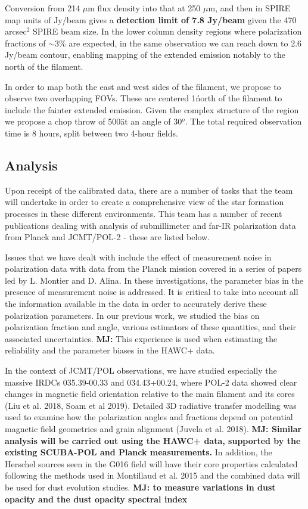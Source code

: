 \documentclass[11pt]{amsart}
\begin{document}
{Conversion from 214 $\mu$m flux density into that at 250 $\mu$m, and then in SPIRE map units of Jy/beam gives a {\bf detection limit of 7.8 Jy/beam}
given the 470 arcsec$^2$ SPIRE beam size.  In the lower column density regions where polarization fractions of $\sim3\%$ are expected, in the same
observation we can reach down to 2.6 Jy/beam contour, enabling mapping of the extended emission notably to the north of the filament.

In order to map both the east and west sides of the filament, we propose to observe two overlapping FOVs. These are centered 1\' north of the filament to include
the fainter extended emission. Given the complex structure of the region we propose a chop throw of 500\" at an angle of 30$^o$. 
The total required observation time is 8 hours, split between two 4-hour fields.


\subsection{Analysis}
Upon receipt of the calibrated data, there are a number of tasks that the team will undertake in order
to create a comprehensive view of the star formation processes in these different environments. This team has a number of recent publications dealing with analysis of submillimeter and far-IR polarization data from Planck and JCMT/POL-2 - these are listed below.

Issues that we have dealt with include the effect of measurement noise in polarization data with data from the Planck mission covered in a series of papers led by L. Montier and D. Alina.
In these investigations, the parameter bias in the presence of measurement noise is addressed. It is critical to take into account all the information available in the data in order to accurately derive these polarization parameters.  In our previous work, we studied the bias on polarization fraction and angle, various estimators of these quantities, and their associated uncertainties. {\bf MJ: }This experience is used when estimating the reliability and the parameter biases in the HAWC+ data.}

In the context of JCMT/POL observations, we have studied especially the massive IRDCs 035.39-00.33 and 034.43+00.24, where POL-2 data showed clear changes in magnetic field orientation relative to the main filament and its cores  (Liu et al. 2018, Soam et al 2019). 
Detailed 3D radiative transfer modelling was used to examine  how the polarization angles and fractions depend on potential magnetic field geometries and grain alignment (Juvela et al. 2018).
{\bf MJ: Similar analysis will be carried out using the HAWC+ data, supported by the existing SCUBA-POL and Planck measurements.}
In addition, the Herschel sources seen in the G016 field will have their core properties calculated following the methods used in Montillaud et al. 2015 and the combined data will be used for dust evolution studies.
{\bf MJ: to measure variations in dust opacity and the dust opacity spectral index}
\end{document}
